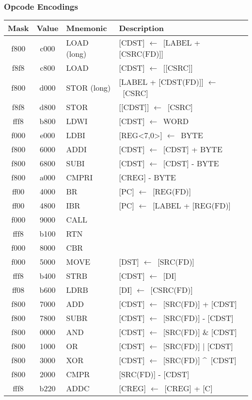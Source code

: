 \documentclass[hidelinks,11pt]{article}
\newcommand{\tn}[1]{\textnormal{#1}}
\newcommand{\la}{$\leftarrow$}
\begin{document}
\pagebreak
\subsubsection{Opcode Encodings}
{
  \centering
  \begin{tabular}{|C|C|L|P{0.5\textwidth}|}
    \hline
    \tn{Mask} & \tn{Value} & \tn{Mnemonic} & \tn{Description} \\
    \hline
    f800 & c000 & LOAD \tn{(long)} & [CDST] \la\ [LABEL + [CSRC(FD)]] \\
    f8f8 & c800 & LOAD & [CDST] \la\ [[CSRC]] \\
    f800 & d000 & STOR \tn{(long)} & [LABEL + [CDST(FD)]] \la\ [CSRC] \\
    f8f8 & d800 & STOR & [[CDST]] \la\ [CSRC] \\
    \hline
    fff8 & b800 & LDWI & [CDST] \la\ WORD \\
    f000 & e000 & LDBI & [REG<7,0>] \la\ BYTE \\
    \hline
    f800 & 6000 & ADDI & [CDST] \la\ [CDST] + BYTE \\
    f800 & 6800 & SUBI & [CDST] \la\ [CDST] - BYTE \\
    f800 & a000 & CMPRI & [CREG] - BYTE \\
    \hline
    ff00 & 4000 & BR & [PC] \la\ [REG(FD)] \\
    ff00 & 4800 & IBR & [PC] \la\ [LABEL + [REG(FD)] \\
    f000 & 9000 & CALL & \\
    fff8 & b100 & RTN & \\
    f000 & 8000 & CBR & \\
    \hline
    f000 & 5000 & MOVE & [DST] \la\ [SRC(FD)] \\
    fff8 & b400 & STRB & [CDST] \la\ [DI] \\
    ff08 & b600 & LDRB & [DI] \la\ [CSRC(FD)] \\
    \hline
    f800 & 7000 & ADD & [CDST] \la\ [SRC(FD)] + [CDST] \\
    f800 & 7800 & SUBR & [CDST] \la\ [SRC(FD)] - [CDST] \\
    f800 & 0000 & AND & [CDST] \la\ [SRC(FD)] \& [CDST] \\
    f800 & 1000 & OR & [CDST] \la\ [SRC(FD)] | [CDST] \\
    f800 & 3000 & XOR & [CDST] \la\ [SRC(FD)] \textasciicircum\ [CDST] \\
    f800 & 2000 & CMPR & [SRC(FD)] - [CDST] \\
    \hline
    fff8 & b220 & ADDC & [CREG] \la\ [CREG] + [C] \\

\end{tabular}}
\end{document}
